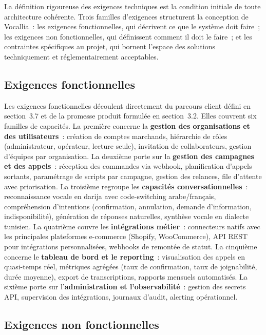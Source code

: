 La définition rigoureuse des exigences techniques est la condition initiale de toute architecture cohérente. Trois familles d'exigences structurent la conception de Vocallia~: les exigences fonctionnelles, qui décrivent ce que le système doit faire~; les exigences non fonctionnelles, qui définissent comment il doit le faire~; et les contraintes spécifiques au projet, qui bornent l'espace des solutions techniquement et réglementairement acceptables.

\subsection{Exigences fonctionnelles}
\label{subsec:exigences_fonctionnelles}

Les exigences fonctionnelles découlent directement du parcours client défini en section~3.7 et de la promesse produit formulée en section~3.2. Elles couvrent six familles de capacités. La première concerne la \textbf{gestion des organisations et des utilisateurs}~: création de comptes marchands, hiérarchie de rôles (administrateur, opérateur, lecture seule), invitation de collaborateurs, gestion d'équipes par organisation. La deuxième porte sur la \textbf{gestion des campagnes et des appels}~: réception des commandes via webhook, planification d'appels sortants, paramétrage de scripts par campagne, gestion des relances, file d'attente avec priorisation. La troisième regroupe les \textbf{capacités conversationnelles}~: reconnaissance vocale en darija avec code-switching arabe/français, compréhension d'intentions (confirmation, annulation, demande d'information, indisponibilité), génération de réponses naturelles, synthèse vocale en dialecte tunisien. La quatrième couvre les \textbf{intégrations métier}~: connecteurs natifs avec les principales plateformes e-commerce (Shopify, WooCommerce), API REST pour intégrations personnalisées, webhooks de remontée de statut. La cinquième concerne le \textbf{tableau de bord et le reporting}~: visualisation des appels en quasi-temps réel, métriques agrégées (taux de confirmation, taux de joignabilité, durée moyenne), export de transcriptions, rapports mensuels automatisés. La sixième porte sur l'\textbf{administration et l'observabilité}~: gestion des secrets API, supervision des intégrations, journaux d'audit, alerting opérationnel.

\subsection{Exigences non fonctionnelles}
\label{subsec:exigences_non_fonctionnelles}

